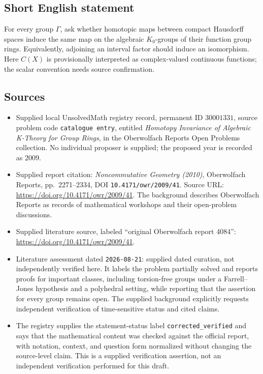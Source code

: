 \documentclass[11pt]{article}
\begin{document}
\subsection{Short English statement}
For every group \(\Gamma\), ask whether homotopic maps between compact Hausdorff spaces induce the same map on the algebraic \(K_0\)-groups of their function group rings. Equivalently, adjoining an interval factor should induce an isomorphism. Here \(C(X)\) is provisionally interpreted as complex-valued continuous functions; the scalar convention needs source confirmation.
\subsection{Sources}
\begin{itemize}
\item Supplied local UnsolvedMath registry record, permanent ID \(30001331\), source problem code \texttt{catalogue entry}, entitled \emph{Homotopy Invariance of Algebraic K-Theory for Group Rings}, in the Oberwolfach Reports Open Problems collection. No individual proposer is supplied; the proposed year is recorded as 2009.
\item Supplied report citation: \emph{Noncommutative Geometry (2010)}, Oberwolfach Reports, pp.\ 2271--2334, DOI \texttt{10.4171/owr/2009/41}. Source URL: \url{https://doi.org/10.4171/owr/2009/41}. The background describes Oberwolfach Reports as records of mathematical workshops and their open-problem discussions.
\item Supplied literature source, labeled ``original Oberwolfach report 4084'': \url{https://doi.org/10.4171/owr/2009/41}.
\item Literature assessment dated \texttt{2026-08-21}: supplied dated curation, not independently verified here. It labels the problem partially solved and reports proofs for important classes, including torsion-free groups under a Farrell--Jones hypothesis and a polyhedral setting, while reporting that the assertion for every group remains open. The supplied background explicitly requests independent verification of time-sensitive status and cited claims.
\item The registry supplies the statement-status label \texttt{corrected\_verified} and says that the mathematical content was checked against the official report, with notation, context, and question form normalized without changing the source-level claim. This is a supplied verification assertion, not an independent verification performed for this draft.
\end{itemize}
\end{document}
